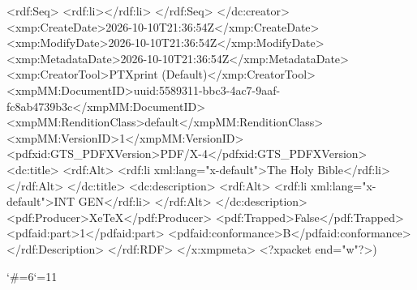 {          <rdf:Seq>
            <rdf:li></rdf:li>
          </rdf:Seq>
        </dc:creator>
        <xmp:CreateDate>2026-10-10T21:36:54Z</xmp:CreateDate>
        <xmp:ModifyDate>2026-10-10T21:36:54Z</xmp:ModifyDate>
        <xmp:MetadataDate>2026-10-10T21:36:54Z</xmp:MetadataDate>
        <xmp:CreatorTool>PTXprint (Default)</xmp:CreatorTool>
        <xmpMM:DocumentID>uuid:5589311-bbc3-4ac7-9aaf-fc8ab4739b3c</xmpMM:DocumentID>
        <xmpMM:RenditionClass>default</xmpMM:RenditionClass>
        <xmpMM:VersionID>1</xmpMM:VersionID>
        <pdfxid:GTS_PDFXVersion>PDF/X-4</pdfxid:GTS_PDFXVersion>
        <dc:title>
          <rdf:Alt>
            <rdf:li xml:lang="x-default">The Holy Bible</rdf:li>
          </rdf:Alt>
        </dc:title>
        <dc:description>
          <rdf:Alt>
            <rdf:li xml:lang="x-default">INT GEN</rdf:li>
          </rdf:Alt>
        </dc:description>
        <pdf:Producer>XeTeX</pdf:Producer>
        <pdf:Trapped>False</pdf:Trapped>
      <pdfaid:part>1</pdfaid:part>
      <pdfaid:conformance>B</pdfaid:conformance>
      </rdf:Description>
  </rdf:RDF>
</x:xmpmeta>
<?xpacket end="w"?>)}
\egroup
\catcode`\#=6\catcode`\@=11 \activ@tecustomch@rs







